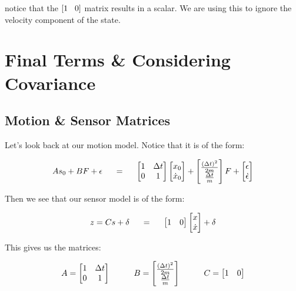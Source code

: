 \documentclass[11pt]{article}
\begin{document}
notice that the $[1 \hspace{3mm} 0]$ matrix results in a scalar. We are using this
to ignore the velocity component of the state.

\section{Final Terms \& Considering Covariance}

\subsection{Motion \& Sensor Matrices}

Let's look back at our motion model. Notice that it is of the form:

\[
A s_0 + B F + \epsilon
\hspace{5mm}
=
\hspace{5mm}
\begin{bmatrix}
1 & \Delta t\\
0 & 1
\end{bmatrix}
\begin{bmatrix}
x_0\\
\dot{x}_0
\end{bmatrix}
+
\begin{bmatrix}
\frac{(\Delta t)^2}{2m}\\
\frac{\Delta t}{m}
\end{bmatrix}
F
+
\begin{bmatrix}
\epsilon\\
\dot{\epsilon}
\end{bmatrix}
\]

Then we see that our sensor model is of the form:

\[
z = Cs + \delta
\hspace{5mm}
=
\hspace{5mm}
\begin{bmatrix}
1 & 0
\end{bmatrix}
\begin{bmatrix}
x\\
\dot{x}
\end{bmatrix}
+
\delta
\]

This gives us the matrices:

\[
A =
\begin{bmatrix}
1 & \Delta t\\
0 & 1
\end{bmatrix}
\hspace{10mm}
B =
\begin{bmatrix}
\frac{(\Delta t)^2}{2m}\\
\frac{\Delta t}{m}
\end{bmatrix}
\hspace{10mm}
C =
\begin{bmatrix}
  1 & 0
\end{bmatrix}
\]
\end{document}
